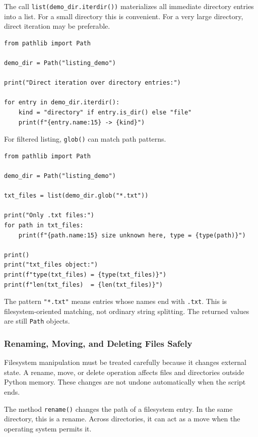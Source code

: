The call \texttt{list(demo\_dir.iterdir())} materializes all immediate directory entries into a list. For a small directory this is convenient. For a very large directory, direct iteration may be preferable.

\begin{verbatim}
from pathlib import Path

demo_dir = Path("listing_demo")

print("Direct iteration over directory entries:")

for entry in demo_dir.iterdir():
    kind = "directory" if entry.is_dir() else "file"
    print(f"{entry.name:15} -> {kind}")
\end{verbatim}

For filtered listing, \texttt{glob()} can match path patterns.

\begin{verbatim}
from pathlib import Path

demo_dir = Path("listing_demo")

txt_files = list(demo_dir.glob("*.txt"))

print("Only .txt files:")
for path in txt_files:
    print(f"{path.name:15} size unknown here, type = {type(path)}")

print()
print("txt_files object:")
print(f"type(txt_files) = {type(txt_files)}")
print(f"len(txt_files)  = {len(txt_files)}")
\end{verbatim}

The pattern \texttt{"*.txt"} means entries whose names end with \texttt{.txt}. This is filesystem-oriented matching, not ordinary string splitting. The returned values are still \texttt{Path} objects.

\subsubsection{Renaming, Moving, and Deleting Files Safely}

Filesystem manipulation must be treated carefully because it changes external state. A rename, move, or delete operation affects files and directories outside Python memory. These changes are not undone automatically when the script ends.

The method \texttt{rename()} changes the path of a filesystem entry. In the same directory, this is a rename. Across directories, it can act as a move when the operating system permits it.

